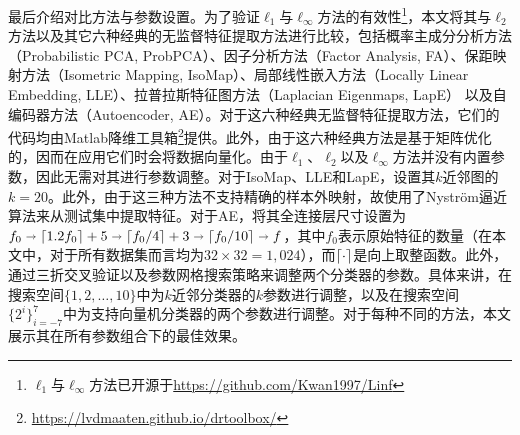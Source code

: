 最后介绍对比方法与参数设置。为了验证$\ell_{1}$与$\ell_{\infty}$方法的有效性\footnote{$\ell_{1}$与$\ell_{\infty}$方法已开源于\url{https://github.com/Kwan1997/Linf}}，本文将其与$\ell_{2}$方法以及其它六种经典的无监督特征提取方法进行比较，包括概率主成分分析方法（Probabilistic PCA, ProbPCA）、因子分析方法（Factor Analysis, FA）、保距映射方法（Isometric Mapping, IsoMap）、局部线性嵌入方法（Locally Linear Embedding, LLE）、拉普拉斯特征图方法（Laplacian Eigenmaps, LapE） 以及自编码器方法（Autoencoder, AE）。对于这六种经典无监督特征提取方法，它们的代码均由Matlab降维工具箱\footnote{\url{https://lvdmaaten.github.io/drtoolbox/}}提供。此外，由于这六种经典方法是基于矩阵优化的，因而在应用它们时会将数据向量化。由于$\ell_{1}$、$\ell_{2}$以及$\ell_{\infty}$方法并没有内置参数，因此无需对其进行参数调整。对于IsoMap、LLE和LapE，设置其$k$近邻图的$k=20$。此外，由于这三种方法不支持精确的样本外映射，故使用了Nystr{\"o}m逼近算法来从测试集中提取特征。对于AE，将其全连接层尺寸设置为$f_{0}\shortrightarrow \lceil1.2f_{0}\rceil+5\shortrightarrow \lceil f_{0}/4\rceil+3\shortrightarrow \lceil f_{0}/10\rceil\shortrightarrow f$，其中$f_{0}$表示原始特征的数量（在本文中，对于所有数据集而言均为$32\times 32=1,024$），而$\lceil\cdot\rceil$是向上取整函数。此外，通过三折交叉验证以及参数网格搜索策略来调整两个分类器的参数。具体来讲，在搜索空间$\{1,2,\ldots,10\}$中为$k$近邻分类器的$k$参数进行调整，以及在搜索空间$\{2^{i}\}_{i=-7}^{7}$中为支持向量机分类器的两个参数进行调整。对于每种不同的方法，本文展示其在所有参数组合下的最佳效果。





